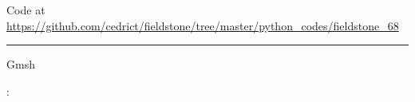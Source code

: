 

\begin{center}
Code at \url{https://github.com/cedrict/fieldstone/tree/master/python_codes/fieldstone_68}
\end{center}

\par\noindent\rule{\textwidth}{0.4pt}


Gmsh \cite{gere09}

\Literature: \cite{vack08}\cite{syva10}\cite{vakn12}
